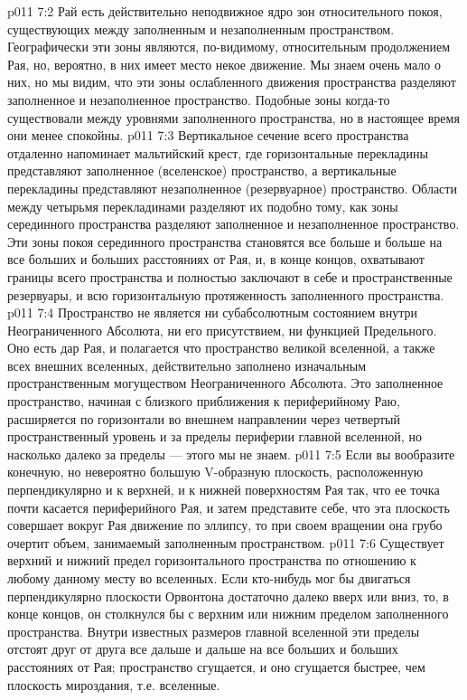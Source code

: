 \vs p011 7:2 Рай есть действительно неподвижное ядро зон относительного покоя, существующих между заполненным и незаполненным пространством. Географически эти зоны являются, по\hyp{}видимому, относительным продолжением Рая, но, вероятно, в них имеет место некое движение. Мы знаем очень мало о них, но мы видим, что эти зоны ослабленного движения пространства разделяют заполненное и незаполненное пространство. Подобные зоны когда\hyp{}то существовали между уровнями заполненного пространства, но в настоящее время они менее спокойны.
\vs p011 7:3 Вертикальное сечение всего пространства отдаленно напоминает мальтийский крест, где горизонтальные перекладины представляют заполненное (вселенское) пространство, а вертикальные перекладины представляют незаполненное (резервуарное) пространство. Области между четырьмя перекладинами разделяют их подобно тому, как зоны серединного пространства разделяют заполненное и незаполненное пространство. Эти зоны покоя серединного пространства становятся все больше и больше на все больших и больших расстояниях от Рая, и, в конце концов, охватывают границы всего пространства и полностью заключают в себе и пространственные резервуары, и всю горизонтальную протяженность заполненного пространства.
\vs p011 7:4 \pc Пространство не является ни субабсолютным состоянием внутри Неограниченного Абсолюта, ни его присутствием, ни функцией Предельного. Оно есть дар Рая, и полагается что пространство великой вселенной, а также всех внешних вселенных, действительно заполнено изначальным пространственным могуществом Неограниченного Абсолюта. Это заполненное пространство, начиная с близкого приближения к периферийному Раю, расширяется по горизонтали во внешнем направлении через четвертый пространственный уровень и за пределы периферии главной вселенной, но насколько далеко за пределы --- этого мы не знаем.
\vs p011 7:5 Если вы вообразите конечную, но невероятно большую V\hyp{}образную плоскость, расположенную перпендикулярно и к верхней, и к нижней поверхностям Рая так, что ее точка почти касается периферийного Рая, и затем представите себе, что эта плоскость совершает вокруг Рая движение по эллипсу, то при своем вращении она грубо очертит объем, занимаемый заполненным пространством.
\vs p011 7:6 Существует верхний и нижний предел горизонтального пространства по отношению к любому данному месту во вселенных. Если кто\hyp{}нибудь мог бы двигаться перпендикулярно плоскости Орвонтона достаточно далеко вверх или вниз, то, в конце концов, он столкнулся бы с верхним или нижним пределом заполненного пространства. Внутри известных размеров главной вселенной эти пределы отстоят друг от друга все дальше и дальше на все больших и больших расстояниях от Рая; пространство сгущается, и оно сгущается быстрее, чем плоскость мироздания, т.е. вселенные.
